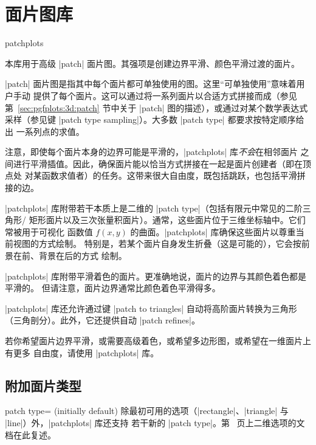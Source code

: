 
\section{面片图库}
\label{sec:lib:patchplots}

{
\def\pgfplotsmanualcurlibrary{patchplots}

\begin{pgfplotslibrary}{patchplots}

本库用于高级 |patch| 面片图。其强项是创建边界平滑、颜色平滑过渡的面片。

|patch| 面片图是指其中每个面片都可单独使用的图。这里“可单独使用”意味着用户手动
提供了每个面片。这可以通过将一系列面片以合适方式拼接而成（参见
第~\ref{sec:pgfplots:3d:patch} 节中关于 |patch| 图的描述），或通过对某个数学表达式
采样（参见键 |patch type sampling|）。大多数 |patch type| 都要求按特定顺序给出
一系列点的求值。

注意，即使每个面片本身的边界可能是平滑的，|patchplots| 库\emph{不会}在相邻面片
之间进行平滑插值。因此，确保面片能以恰当方式拼接在一起是面片创建者（即在顶点处
对某函数求值者）的任务。这带来很大自由度，既包括跳跃，也包括平滑拼接的边。

|patchplots| 库附带若干本质上是二维的 |patch type|（包括有限元中常见的二阶三角形/
矩形面片以及三次张量积面片）。通常，这些面片位于三维坐标轴中。它们常被用于可视化
函数值 $f(x,y)$ 的曲面。|patchplots| 库确保这些面片以尊重当前视图的方式绘制。
特别是，若某个面片自身发生折叠（这是可能的），它会按前景在前、背景在后的方式
绘制。

|patchplots| 库附带平滑着色的面片。更准确地说，面片的边界与其颜色着色都是平滑的。
但请注意，面片边界通常比颜色着色平滑得多。

|patchplots| 库还允许通过键 |patch to triangles| 自动将高阶面片转换为三角形
（三角剖分）。此外，它还提供自动 |patch refines|。

若你希望面片边界平滑，或需要高级着色，或希望多边形图，或希望在一维面片上有更多
自由度，请使用 |patchplots| 库。


\subsection{附加面片类型}

%
\begin{pgfplotskey}{patch type= (initially default)%
}
    除最初可用的选项（|rectangle|、|triangle| 与 |line|）外，|patchplots| 库还支持
    若干新的 |patch type|。第~\pageref{key:patch:type} 页上二维选项的文档在此复述。


\end{pgfplotskey}
\end{pgfplotslibrary}}
